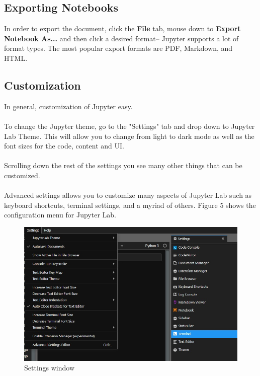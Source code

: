 \documentclass[pdftex,12pt]{artikel3}
\begin{document}
\subsection{Exporting Notebooks}
In order to export the document, click the \textbf{File} tab, mouse down to \textbf{Export Notebook As...} and then click a desired format-- Jupyter supports a lot of format types.
The most popular export formats are PDF, Markdown, and HTML. 

\subsection{Customization}
In general, customization of Jupyter easy.\\
\\
To change the Jupyter theme, go to the "Settings" tab and drop down to Jupyter Lab Theme. This will allow you to change from light to dark mode as well as the font sizes for the code, content and UI.\\
\\
Scrolling down the rest of the settings you see many other things that can be customized.\\
\\
Advanced settings allows you to customize many aspects of Jupyter Lab such as keyboard shortcuts, terminal settings, and a myriad of others. Figure 5 shows the configuration menu for Jupyter Lab.

\begin{figure}[h!]
    \centering
    \includegraphics[width=15cm]{settings.jpg}
    \caption{Settings window}
    \label{fig:configuration}
\end{figure}
\end{document}
